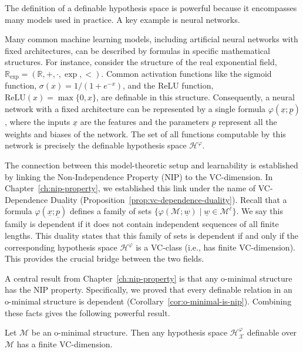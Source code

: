 The definition of a definable hypothesis space is powerful because it encompasses many models used in practice. A key example is neural networks.

\begin{example}
    Many common machine learning models, including artificial neural networks with fixed architectures, can be described by formulas in specific mathematical structures. For instance, consider the structure of the real exponential field, $\mathbb{R}_{\text{exp}} = (\mathbb{R}, +, \cdot, \exp, <)$. Common activation functions like the sigmoid function, $\sigma(x) = 1/(1+e^{-x})$, and the ReLU function, $\text{ReLU}(x) = \max\{0,x\}$, are definable in this structure. Consequently, a neural network with a fixed architecture can be represented by a single formula $\varphi(\underline{x}; \underline{p})$, where the inputs $\underline{x}$ are the features and the parameters $\underline{p}$ represent all the weights and biases of the network. The set of all functions computable by this network is precisely the definable hypothesis space $\mathcal{H}^\varphi$.
\end{example}

The connection between this model-theoretic setup and learnability is established by linking the Non-Independence Property (NIP) to the VC-dimension. In Chapter~\ref{ch:nip-property}, we established this link under the name of VC-Dependence Duality (Proposition~\ref{prop:vc-dependence-duality}). Recall that a formula $\varphi(\underline{x}; \underline{p})$ defines a family of sets $\{\varphi(\mathcal{M}; \underline{w}) \mid \underline{w} \in \mathcal{M}^\ell\}$. We say this family is dependent if it does not contain independent sequences of all finite lengths. This duality states that this family of sets is dependent if and only if the corresponding hypothesis space $\mathcal{H}^\varphi$ is a VC-class (i.e., has finite VC-dimension). This provides the crucial bridge between the two fields.

A central result from Chapter~\ref{ch:nip-property} is that any o-minimal structure has the NIP property. Specifically, we proved that every definable relation in an o-minimal structure is dependent (Corollary~\ref{cor:o-minimal-is-nip}). Combining these facts gives the following powerful result.

\begin{theorem}
    \label{thm:o-minimal-finite-vc}
    Let $\mathcal{M}$ be an o-minimal structure. Then any hypothesis space $\mathcal{H}_\mathcal{X}^\varphi$ definable over $\mathcal{M}$ has a finite VC-dimension.
\end{theorem}

